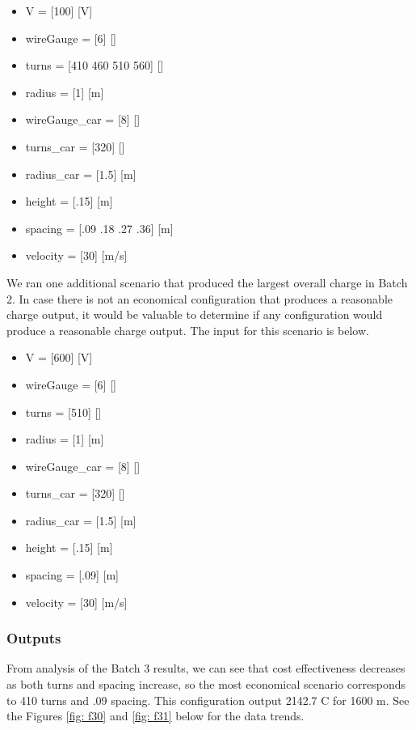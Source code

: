 \begin{itemize}
    \item V = [100] [V]
    \item wireGauge = [6] []
    \item turns = [410 460 510 560] []
    \item radius = [1] [m]
    \item wireGauge\_car = [8] []
    \item turns\_car = [320] []
    \item radius\_car = [1.5] [m]
    \item height = [.15] [m]
    \item spacing = [.09 .18 .27 .36] [m]
    \item velocity = [30] [m/s]
\end{itemize}

We ran one additional scenario that produced the largest overall charge in Batch 2. In case there is not an 
economical configuration that produces a reasonable charge output, it would be valuable to determine if any 
configuration would produce a reasonable charge output. The input for this scenario is below. 

\begin{itemize}
    \item V = [600] [V]
    \item wireGauge = [6] []
    \item turns = [510] []
    \item radius = [1] [m]
    \item wireGauge\_car = [8] []
    \item turns\_car = [320] []
    \item radius\_car = [1.5] [m]
    \item height = [.15] [m]
    \item spacing = [.09] [m]
    \item velocity = [30] [m/s]
\end{itemize}

\subsubsection{Outputs}
From analysis of the Batch 3 results, we can see that cost effectiveness decreases as both turns and spacing 
increase, so the most economical scenario corresponds to 410 turns and .09 spacing. This configuration output 
2142.7 C for 1600 m. See the Figures \ref{fig: f30} and \ref{fig: f31} below for the data trends.

